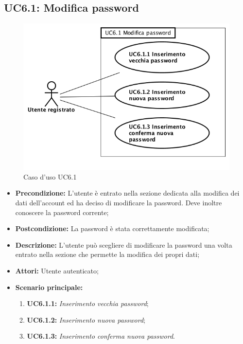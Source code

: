 \newpage
\subsection{ UC6.1: Modifica password}

\begin{figure}[h]
	\begin{center}
	\includegraphics[scale=0.4]{diagram/UC6-1.png}
	\caption{Caso d'uso UC6.1}
	\end{center}
\end{figure}
\begin{itemize}
	\item \textbf{Precondizione:} L’utente è entrato nella sezione dedicata alla modifica dei dati dell’account ed ha deciso di modificare la password. Deve inoltre conoscere la password corrente;
	\item \textbf{Postcondizione:} La password è stata correttamente modificata;
	\item \textbf{Descrizione:} L’utente può scegliere di modificare la password una volta entrato nella sezione che permette la modifica dei propri dati;
	\item \textbf{Attori:} Utente autenticato;
	\item \textbf{Scenario principale:}
	\begin{enumerate}
		\item \textbf{ UC6.1.1:} \textit{ Inserimento vecchia password};
		\item \textbf{ UC6.1.2:} \textit{ Inserimento nuova password};
		\item \textbf{ UC6.1.3:} \textit{ Inserimento conferma nuova password}.
	\end{enumerate}
\end{itemize}
